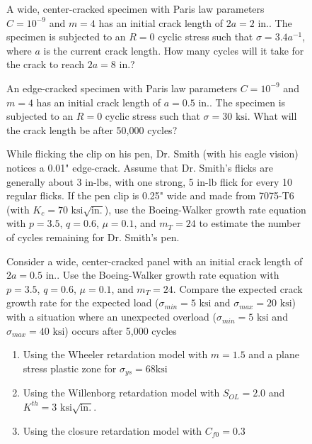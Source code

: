 \documentclass[12pt, oneside]{article}
\begin{document}
\begin{enumerate}

\begin{figure}[H]
	\item A wide, center-cracked specimen with Paris law parameters $C=10^{-9}$ and $m=4$ has an initial crack length of $2a = 2 \text{ in.}$. 
	The specimen is subjected to an $R=0$ cyclic stress such that $\sigma = 3.4a^{-1}$, where $a$ is the current crack length. 
	How many cycles will it take for the crack to reach $2a = 8 \text{ in.}$?
\end{figure}

\begin{figure}[H]
	\item An edge-cracked specimen with Paris law parameters $C=10^{-9}$ and $m=4$ has an initial crack length of $a = 0.5 \text{ in.}$. 
	The specimen is subjected to an $R=0$ cyclic stress such that $\sigma = 30 \text{ ksi}$.
	What will the crack length be after 50,000 cycles?
\end{figure}

\begin{figure}[H]
	\item While flicking the clip on his pen, Dr. Smith (with his eagle vision) notices a 0.01" edge-crack.
	Assume that Dr. Smith's flicks are generally about 3 in-lbs, with one strong, 5 in-lb flick for every 10 regular flicks.
	If the pen clip is 0.25" wide and made from 7075-T6 (with $K_c = 70 \text{ ksi}\sqrt{\text{in.}}$), use the Boeing-Walker growth rate equation with $p=3.5$, $q=0.6$, $\mu=0.1$, and $m_T = 24$ to estimate the number of cycles remaining for Dr. Smith's pen.
\end{figure}

\begin{figure}[H]
	\item Consider a wide, center-cracked panel with an initial crack length of $2a = 0.5 \text{ in.}$.
	Use the Boeing-Walker growth rate equation with $p=3.5$, $q=0.6$, $\mu=0.1$, and $m_T = 24$.
	Compare the expected crack growth rate for the expected load ($\sigma_{min} = 5 \text{ ksi}$ and $\sigma_{max} = 20 \text{ ksi}$) with a situation where an unexpected overload ($\sigma_{min} = 5 \text{ ksi}$ and $\sigma_{max} = 40 \text{ ksi}$) occurs after 5,000 cycles
	\begin{enumerate}
		\item Using the Wheeler retardation model with $m = 1.5$ and a plane stress plastic zone for $\sigma_{ys} = 68 \text{ksi}$
		\item Using the Willenborg retardation model with $S_{OL} = 2.0$ and $K^{th} = 3 \text{ ksi}\sqrt{\text{in.}}$.
		\item Using the closure retardation model with $C_{f0} = 0.3$
	\end{enumerate}
\end{figure}

\end{enumerate}
\end{document}
